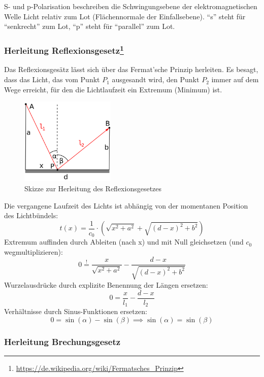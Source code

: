 \documentclass[a4paper, 11pt, ngerman, parskip=half]{scrartcl}
\begin{document}
%
S- und p-Polarisation beschreiben die Schwingungsebene der elektromagnetischen Welle Licht relativ zum Lot (Flächennormale der Einfallsebene). \enquote{s} steht für \enquote{senkrecht} zum Lot, \enquote{p} steht für \enquote{parallel} zum Lot.

\subsubsection*{Herleitung Reflexionsgesetz\footnote{\url{https://de.wikipedia.org/wiki/Fermatsches_Prinzip}}}
Das Reflexionsgesätz lässt sich über das Fermat'sche Prinzip herleiten. Es besagt, dass das Licht, das vom Punkt $P_1$ ausgesandt wird, den Punkt $P_2$ immer auf dem Wege erreicht, für den die Lichtlaufzeit ein Extremum (Minimum) ist.
%
\begin{figure}[H]
    \centering
    \begin{samepage}
        \includegraphics[width=0.4\textwidth]{image/15/reflexionsgesetz.png}
        \caption{Skizze zur Herleitung des Reflexionsgesetzes}
        \label{fig:reflexionsgesetz}
    \end{samepage}
\end{figure}
%
Die vergangene Laufzeit des Lichts ist abhängig von der momentanen Position des Lichtbündels:
\[t(x) = \frac{1}{c_0} \cdot \left( \sqrt{x^2+a^2} + \sqrt{(d-x)^2 + b^2} \right)\]
Extremum auffinden durch Ableiten (nach x) und mit Null gleichsetzen (und $c_0$ wegmultiplizieren):
\[0 \overset{!}{=} \frac{x}{\sqrt{x^2 + a^2}} - \frac{d-x}{\sqrt{(d-x)^2 + b^2}}\]
Wurzelausdrücke durch explizite Benennung der Längen ersetzen:
\[0 = \frac{x}{l_1} - \frac{d-x}{l_2}\]
Verhältnisse durch Sinus-Funktionen ersetzen:
\[0 = \sin(\alpha) - \sin(\beta) \implies \sin(\alpha) = \sin(\beta)\]

\subsubsection*{Herleitung Brechungsgesetz}
\end{document}
